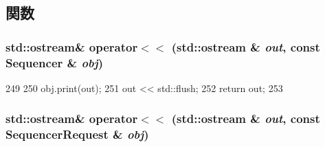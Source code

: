\subsection{関数}
\hypertarget{Sequencer_8hh_ac52709b647b4bac80da596daa1f8f442}{
\subsubsection[{operator$<$$<$}]{\setlength{\rightskip}{0pt plus 5cm}std::ostream\& operator$<$$<$ (std::ostream \& {\em out}, \/  const {\bf Sequencer} \& {\em obj})}}
\label{Sequencer_8hh_ac52709b647b4bac80da596daa1f8f442}



\begin{DoxyCode}
249 {
250     obj.print(out);
251     out << std::flush;
252     return out;
253 }
\end{DoxyCode}
\hypertarget{Sequencer_8hh_adb95dfdb7c6bdd6c52bdfe35ce8449aa}{
\subsubsection[{operator$<$$<$}]{\setlength{\rightskip}{0pt plus 5cm}std::ostream\& operator$<$$<$ (std::ostream \& {\em out}, \/  const {\bf SequencerRequest} \& {\em obj})}}
\label{Sequencer_8hh_adb95dfdb7c6bdd6c52bdfe35ce8449aa}
